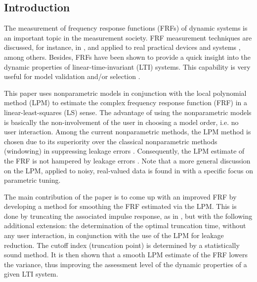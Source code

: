 \subsection{Introduction}

The measurement of frequency response functions (FRFs) of dynamic systems is an important topic in the measurement society.  FRF measurement techniques are discussed, for instance, in 
\cite{Schoukens1998ImprFRFmeas,schoukens2006leakagereduction,guillaume1996,broersen1995transferfunction,pintelon2010lpm1,Antoni20071723,FDidentEd2Pintelon}, and applied to real practical devices and systems \cite{Lim2010,Robinson1990,Behjat2010}, among others. Besides, FRFs have been shown to provide a quick insight into the dynamic properties of linear-time-invariant (LTI) systems. This capability is very useful for model validation and/or selection \cite{FDidentEd2Pintelon}.

This paper uses nonparametric models in conjunction with the local polynomial method (LPM) \cite{pintelon2010lpm1} to estimate the complex frequency response function (FRF) in a linear-least-squares (LS) sense. The advantage of using the nonparametric models is basically the non-involvement of the user in choosing a model order, i.e. no user interaction. Among the current nonparametric methods, the LPM method is chosen due to its superiority over the classical nonparametric methods (windowing) in suppressing leakage errors \cite{bendatPiersol1993,Oppenheim1983}. Consequently, the LPM estimate of the FRF is not hampered by leakage errors \cite{pintelon2010lpm1,schoukens2010nonparametric}. Note that a more general discussion on the LPM, applied to noisy, real-valued data is found in \cite{fanGijbels1996LPM} with a specific focus on parametric tuning.

The main contribution of the paper is to come up with an improved FRF by developing a method for smoothing the FRF estimated via the LPM. This is done by truncating the associated impulse response, as in \cite{Schoukens1998ImprFRFmeas}, but with the following additional extension: the determination of the optimal truncation time, without any user interaction, in conjunction with the use of the LPM for leakage reduction. The cutoff index (truncation point) is determined by a statistically sound method. It is then shown that a smooth LPM estimate of the FRF lowers the variance, thus improving the assessment level of the dynamic properties of a given LTI system. 

